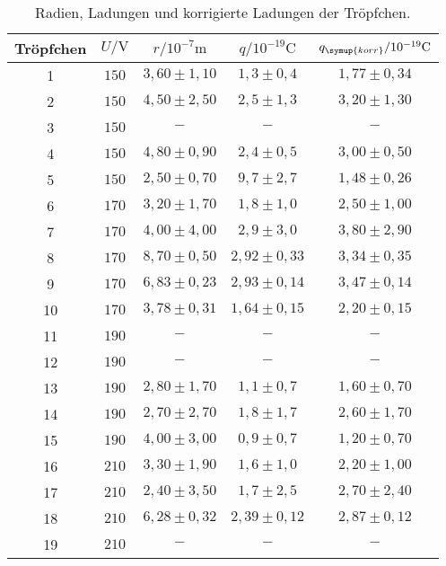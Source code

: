 \begin{table}
  \centering
  \caption{Radien, Ladungen und korrigierte Ladungen der Tröpfchen.}
  \label{tab:q}
  \begin{tabular}{c | c c c c}
    \toprule
    Tröpfchen & $U/\si{\volt}$ & $r/10^{-7}\si{\meter}$ & $q/10^{-19}\si{\coulomb}$ & $q_{\symup{korr}}/10^{-19}\si{\coulomb}$ \\
    \midrule
     1 & $150$ & $3,60 \pm 1,10$  & $1,3 \pm 0,4$   & $1,77 \pm 0,34$   \\
     2 & $150$ & $4,50 \pm 2,50$  & $2,5 \pm 1,3$   & $3,20 \pm 1,30$   \\
     3 & $150$ & $-$              & $-$             & $-$               \\
     4 & $150$ & $4,80 \pm 0,90$  & $2,4 \pm 0,5$   & $3,00 \pm 0,50$   \\
     5 & $150$ & $2,50 \pm 0,70$  & $9,7 \pm 2,7$   & $1,48 \pm 0,26$   \\
     6 & $170$ & $3,20 \pm 1,70$  & $1,8 \pm 1,0$   & $2,50 \pm 1,00$   \\
     7 & $170$ & $4,00 \pm 4,00$  & $2,9 \pm 3,0$   & $3,80 \pm 2,90$   \\
     8 & $170$ & $8,70 \pm 0,50$  & $2,92 \pm 0,33$ & $3,34 \pm 0,35$   \\
     9 & $170$ & $6,83 \pm 0,23$  & $2,93 \pm 0,14$ & $3,47 \pm 0,14$   \\
    10 & $170$ & $3,78 \pm 0,31$  & $1,64 \pm 0,15$ & $2,20 \pm 0,15$   \\
    11 & $190$ & $-$              & $-$             & $-$               \\
    12 & $190$ & $-$              & $-$             & $-$               \\
    13 & $190$ & $2,80 \pm 1,70$  & $1,1 \pm 0,7$   & $1,60 \pm 0,70$   \\
    14 & $190$ & $2,70 \pm 2,70$  & $1,8 \pm 1,7$   & $2,60 \pm 1,70$   \\
    15 & $190$ & $4,00 \pm 3,00$  & $0,9 \pm 0,7$   & $1,20 \pm 0,70$   \\
    16 & $210$ & $3,30 \pm 1,90$  & $1,6 \pm 1,0$   & $2,20 \pm 1,00$   \\
    17 & $210$ & $2,40 \pm 3,50$  & $1,7 \pm 2,5$   & $2,70 \pm 2,40$   \\
    18 & $210$ & $6,28 \pm 0,32$  & $2,39 \pm 0,12$ & $2,87 \pm 0,12$   \\
    19 & $210$ & $-$              & $-$             & $-$               \\

\end{tabular}
\end{table}
